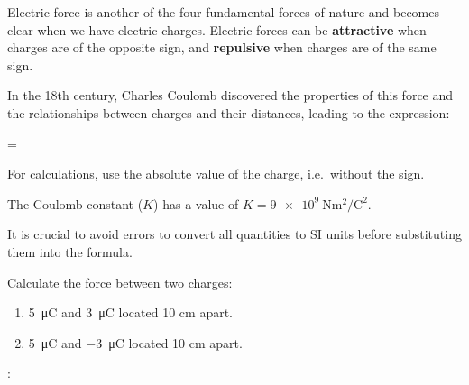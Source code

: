 Electric force is another of the four fundamental forces of nature and becomes clear when we have electric charges.
Electric forces can be \textbf{attractive} when charges are of the opposite sign, and \textbf{repulsive} when charges are of the same sign.

In the 18th century, Charles Coulomb discovered the properties of this force and the relationships between charges and their distances, leading to the expression:
\vspace{36pt}

\begin{centeredequation}
     =
     \cdot
\end{centeredequation}

\vspace{36pt}

\begin{remark}
    For calculations, use the absolute value of the charge, i.e.\ without the sign.
\end{remark}

The Coulomb constant (\( K \)) has a value of \( K = \qty{9e9}{\newton\square\metre\per\square\coulomb} \).

\begin{remark}
    It is crucial to avoid errors to convert all quantities to SI units before substituting them into the formula.
\end{remark}


\begin{exercise}
    Calculate the force between two charges:
    \begin{enumerate}[label=\alph*)]
\item \qty{+5}{\micro\coulomb} and \qty{+3}{\micro\coulomb} located 10 cm apart.
\item \qty{+5}{\micro\coulomb} and \qty{-3}{\micro\coulomb} located 10 cm apart.
    \end{enumerate}

    \datos{}: \ctecoulomb

\end{exercise}


